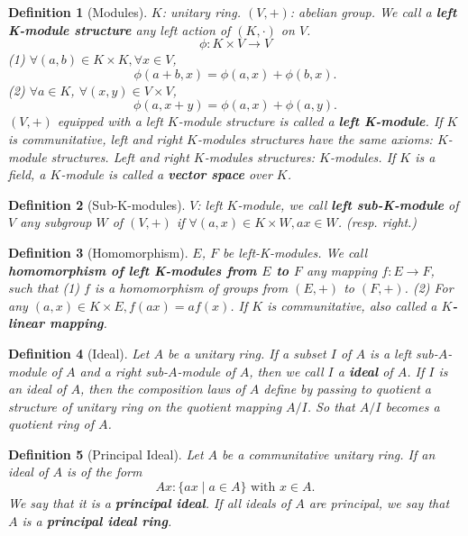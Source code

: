 \documentclass{article}
\theoremstyle{1}
\newtheorem{definition}{Definition}[section]
\begin{document}
\begin{definition}[Modules]
    $K$: unitary ring. $(V, +)$: abelian group. We call a \textbf{left K-module structure} any left action of $(K, \cdot)$ on $V$. 
    $$\phi:K\times V\longrightarrow V$$
    (1) $\forall (a, b)\in K\times K, \forall x\in V$, $$\phi(a+b, x)=\phi(a, x)+\phi(b, x).$$
    (2) $\forall a\in K$,  $\forall (x, y)\in V\times V$, $$\phi(a, x+y)=\phi(a, x)+\phi(a, y).$$
    $(V, +)$ equipped with a left $K$-module structure is called a \textbf{left K-module}. If $K$ is communitative,  left and right $K$-modules structures have the same axioms: $K$-module structures. Left and right $K$-modules structures: $K$-modules.
    If $K$ is a field,  a $K$-module is called a \textbf{vector space} over $K$.
\end{definition}
\begin{definition}[Sub-K-modules]
    $V$: left $K$-module,  we call \textbf{left sub-K-module} of $V$ any subgroup $W$ of $(V, +)$ if $\forall(a, x)\in K\times W, ax\in W$. (resp. right.)
\end{definition}
\begin{definition}[Homomorphism]
    $E$, $F$ be left-K-modules. We call \textbf{homomorphism of left K-modules from $E$ to $F$} any mapping $f:E\rightarrow F$,  such that 
    \newline
    (1) $f$ is a homomorphism of groups from $(E, +)$ to $(F, +)$.
    \newline
    (2) For any $(a, x)\in K\times E, f(ax)=af(x)$.
    \newline
    If $K$ is communitative, also called a \textbf{$K$-linear mapping}.
\end{definition}
\begin{definition}[Ideal]
    Let $A$ be a unitary ring. If a subset $I$ of $A$ is a left sub-$A$-module of $A$ and a right sub-$A$-module of $A$, then we call $I$ a \textbf{ideal} of $A$. If $I$ is an ideal of $A$, then the composition laws of $A$ define by passing to quotient a structure of unitary ring on the quotient mapping $A/I$. So that $A/I$ becomes a quotient ring of $A$.
\end{definition}
\begin{definition}[Principal Ideal]
    Let $A$ be a communitative unitary ring. If an ideal of $A$ is of the form 
    $$Ax:\{ax\mid a\in A\}\text{ with }x\in A.$$
    We say that it is a \textbf{principal ideal}. If all ideals of $A$ are principal, we say that $A$ is a \textbf{principal ideal ring}. 
\end{definition}
\end{document}
